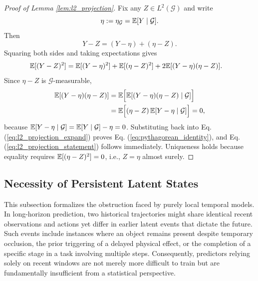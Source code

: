 \begin{proof}[Proof of Lemma \ref{lem:l2_projection}]
Fix any $Z\in L^2(\mathcal G)$ and write
\[
\eta := \eta_{\mathcal G} = \mathbb{E}[Y\mid \mathcal G].
\]
Then
\[
Y-Z = (Y-\eta) + (\eta-Z).
\]
Squaring both sides and taking expectations gives
\begin{align}
\mathbb{E}[(Y-Z)^2]
&=
\mathbb{E}[(Y-\eta)^2]
+
\mathbb{E}[(\eta-Z)^2]
+
2\mathbb{E}[(Y-\eta)(\eta-Z)].
\label{eq:l2_projection_expand}
\end{align}
Since $\eta-Z$ is $\mathcal G$-measurable,
\begin{align}
\mathbb{E}[(Y-\eta)(\eta-Z)]
&=
\mathbb{E}\Bigl[
\mathbb{E}[(Y-\eta)(\eta-Z)\mid \mathcal G]
\Bigr]
\nonumber\\
&=
\mathbb{E}\Bigl[
(\eta-Z)\,\mathbb{E}[Y-\eta\mid \mathcal G]
\Bigr]
=
0,
\end{align}
because $\mathbb{E}[Y-\eta\mid \mathcal G]=\mathbb{E}[Y\mid \mathcal G]-\eta=0$.
Substituting back into Eq. (\ref{eq:l2_projection_expand}) proves Eq. (\ref{eq:pythagorean_identity}), and Eq. (\ref{eq:l2_projection_statement}) follows immediately.
Uniqueness holds because equality requires $\mathbb{E}[(\eta-Z)^2]=0$, i.e., $Z=\eta$ almost surely.
\end{proof}













\subsection{Necessity of Persistent Latent States}
\label{subsec:necessity_persistent_state}

This subsection formalizes the obstruction faced by purely local temporal models.  In long-horizon prediction, two historical trajectories might share identical recent observations and actions yet differ in earlier latent events that dictate the future. Such events include instances where an object remains present despite temporary occlusion, the prior triggering of a delayed physical effect, or the completion of a specific stage in a task involving multiple steps. Consequently, predictors relying solely on recent windows are not merely more difficult to train but are fundamentally insufficient from a statistical perspective.

